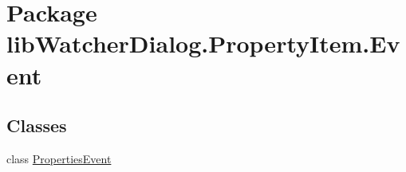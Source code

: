 \hypertarget{namespacelib_watcher_dialog_1_1_property_item_1_1_event}{\section{Package lib\+Watcher\+Dialog.\+Property\+Item.\+Event}
\label{namespacelib_watcher_dialog_1_1_property_item_1_1_event}
}
\subsection*{Classes}
\begin{DoxyCompactItemize}
\item 
class \hyperlink{classlib_watcher_dialog_1_1_property_item_1_1_event_1_1_properties_event}{Properties\+Event}
\end{DoxyCompactItemize}
